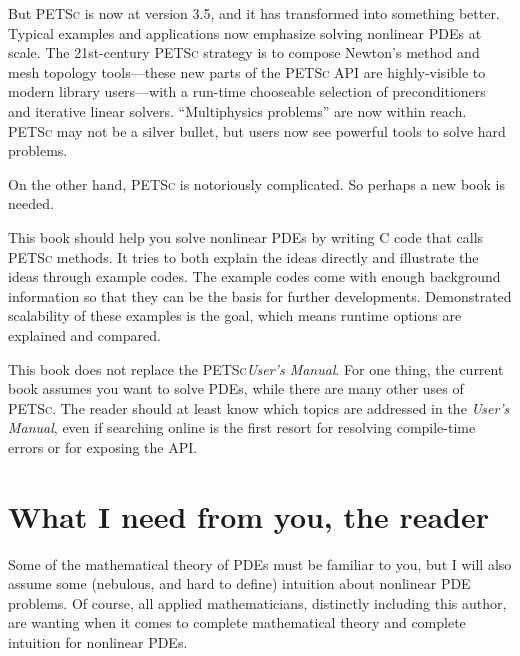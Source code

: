 \documentclass{tufte-book}
\newcommand{\PETSc}{\textsc{PETSc}\xspace}
\begin{document}
But \PETSc is now at version 3.5, and it has transformed into something better.  Typical examples and applications now emphasize solving nonlinear PDEs at scale.  The 21st-century \PETSc strategy is to compose Newton's method and mesh topology tools---these new parts of the \PETSc API are highly-visible to modern library users---with a run-time chooseable selection of preconditioners and iterative linear solvers.  ``Multiphysics problems'' are now within reach.  \PETSc may not be a silver bullet, but users now see powerful tools to solve hard problems.

On the other hand, \PETSc is notoriously complicated.  So perhaps a new book is needed.

This book should help you solve nonlinear PDEs by writing C code that calls \PETSc methods.  It tries to both explain the ideas directly and illustrate the ideas through example codes.  The example codes come with enough background information so that they can be the basis for further developments.  Demonstrated scalability of these examples is the goal, which means runtime options are explained and compared.

This book does not replace the \PETSc \emph{User's Manual}.  For one thing, the current book assumes you want to solve PDEs, while there are many other uses of \PETSc.  The reader should at least know which topics are addressed in the \emph{User's Manual}, even if searching online is the first resort for resolving compile-time errors or for exposing the API.

\section{What I need from you, the reader}  

Some of the mathematical theory of PDEs must be familiar to you, but I will also assume some (nebulous, and hard to define) intuition about nonlinear PDE problems.  Of course, all applied mathematicians, distinctly including this author, are wanting when it comes to complete mathematical theory and complete intuition for nonlinear PDEs.
\end{document}
